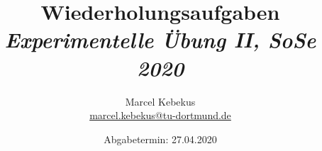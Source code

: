 

\title{
  Wiederholungsaufgaben\\
  \small{\emph{Experimentelle Übung II, SoSe 2020}}
  }
\author{%
  Marcel Kebekus\\%
  \href{mailto:marcel.kebekus@tu-dortmund.de}{\small{marcel.kebekus@tu-dortmund.de}}%
}
\date{%
  \small{Abgabetermin: 27.04.2020} 
}
\makeatletter         
\def\@maketitle{
\raggedright
\texttt{[image: bilder/lo\_TU-Do 2008/logo\_rgb\_jpg]}\\[8ex]
\begin{center}
{\Huge \bfseries \sffamily \@title }\\[4ex] 
{\Large  \@author}\\[4ex] 
\@date\\[8ex]
\publishers\\
\end{center}}



\maketitle
\newpage

\newpage

\newpage




